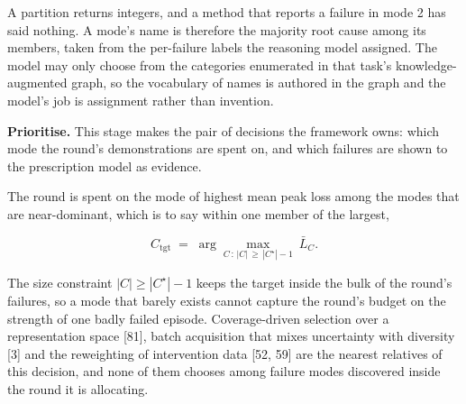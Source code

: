 \documentclass[
  11pt,
]{article}
\begin{document}
A partition returns integers, and a method that reports a failure in
mode 2 has said nothing. A mode's name is therefore the majority root
cause among its members, taken from the per-failure labels the reasoning
model assigned. The model may only choose from the categories enumerated
in that task's knowledge-augmented graph, so the vocabulary of names is
authored in the graph and the model's job is assignment rather than
invention.

\textbf{Prioritise.} This stage makes the pair of decisions the
framework owns: which mode the round's demonstrations are spent on, and
which failures are shown to the prescription model as evidence.

The round is spent on the mode of highest mean peak loss among the modes
that are near-dominant, which is to say within one member of the
largest,

\[C_{\mathrm{tgt}} \;=\; \arg\max_{C \,:\, |C| \,\ge\, |C^\star| - 1} \ \bar{L}_C. \tag{8}\]

The size constraint \(|C| \ge |C^\star| - 1\) keeps the target inside
the bulk of the round's failures, so a mode that barely exists cannot
capture the round's budget on the strength of one badly failed episode.
Coverage-driven selection over a representation space {[}81{]}, batch
acquisition that mixes uncertainty with diversity {[}3{]} and the
reweighting of intervention data {[}52, 59{]} are the nearest relatives
of this decision, and none of them chooses among failure modes
discovered inside the round it is allocating.
\end{document}
